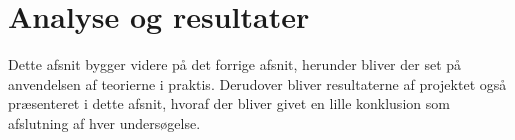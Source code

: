 \section{Analyse og resultater}
Dette afsnit bygger videre på det forrige afsnit, herunder bliver der set på anvendelsen af teorierne i praktis. Derudover bliver resultaterne af projektet også præsenteret i dette afsnit, hvoraf der bliver givet en lille konklusion som afslutning af hver undersøgelse.





